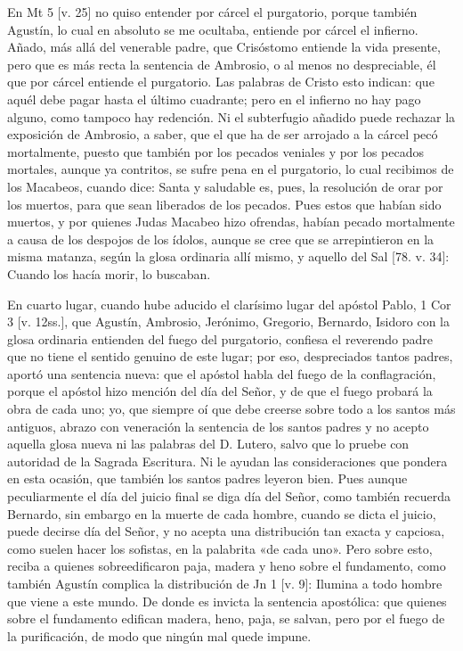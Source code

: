 En Mt 5 [v. 25] no quiso entender por cárcel el purgatorio, porque también Agustín, lo cual en absoluto se me ocultaba, entiende por cárcel el infierno. Añado, más allá del venerable padre, que Crisóstomo entiende la vida presente, pero que es más recta la sentencia de Ambrosio, o al menos no despreciable, él que por cárcel entiende el purgatorio. Las palabras de Cristo esto indican: que aquél debe pagar hasta el último cuadrante; pero en el infierno no hay pago alguno, como tampoco hay redención. Ni el subterfugio añadido puede rechazar la exposición de Ambrosio, a saber, que el que ha de ser arrojado a la cárcel pecó mortalmente, puesto que también por los pecados veniales y por los pecados mortales, aunque ya contritos, se sufre pena en el purgatorio, lo cual recibimos de los Macabeos, cuando dice: Santa y saludable es, pues, la resolución de orar por los muertos, para que sean liberados de los pecados. Pues estos que habían sido muertos, y por quienes Judas Macabeo hizo ofrendas, habían pecado mortalmente a causa de los despojos de los ídolos, aunque se cree que se arrepintieron en \marginpar{\small[336]} la misma matanza, según la glosa ordinaria allí mismo, y aquello del Sal [78. v. 34]: Cuando los hacía morir, lo buscaban.

En cuarto lugar, cuando hube aducido el clarísimo lugar del apóstol Pablo, 1 Cor 3 [v. 12ss.], que Agustín, Ambrosio, Jerónimo, Gregorio, Bernardo, Isidoro con la glosa ordinaria entienden del fuego del purgatorio, confiesa el reverendo padre que no tiene el sentido genuino de este lugar; por eso, despreciados tantos padres, aportó una sentencia nueva: que el apóstol habla del fuego de la conflagración, porque el apóstol hizo mención del día del Señor, y de que el fuego probará la obra de cada uno; yo, que siempre oí que debe creerse sobre todo a los santos más antiguos, abrazo con veneración la sentencia de los santos padres y no acepto aquella glosa nueva ni las palabras del D. Lutero, salvo que lo pruebe con autoridad de la Sagrada Escritura. Ni le ayudan las consideraciones que pondera en esta ocasión, que también los santos padres leyeron bien. Pues aunque peculiarmente el día del juicio final se diga día del Señor, como también recuerda Bernardo, sin embargo en la muerte de cada hombre, cuando se dicta el juicio, puede decirse día del Señor, y no acepta una distribución tan exacta y capciosa, como suelen hacer los sofistas, en la palabrita «de cada uno». Pero sobre esto, reciba a quienes sobreedificaron paja, madera y heno sobre el fundamento, como también Agustín complica la distribución de Jn 1 [v. 9]: Ilumina a todo hombre que viene a este mundo. De donde es invicta la sentencia apostólica: que quienes sobre el fundamento edifican madera, heno, paja, se salvan, pero por el fuego de la purificación, de modo que ningún mal quede impune.

